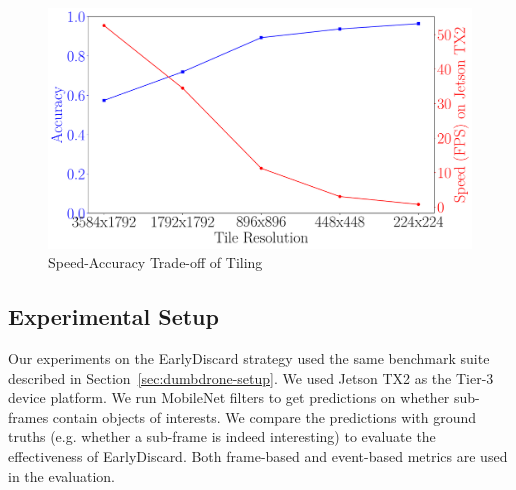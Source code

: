 \begin{figure}
    \centering
    \includegraphics[width=.8\linewidth]{FIGS/fig-tile-resolution-speed-accuracy.pdf}
    \caption{Speed-Accuracy Trade-off of Tiling}
    \label{fig:earlydiscard-tile-accuracy-speed}
\end{figure}


\subsection{Experimental Setup}

Our experiments on the EarlyDiscard strategy used the same benchmark suite
described in Section~\ref{sec:dumbdrone-setup}. We used Jetson TX2 as the Tier-3
device platform. We run MobileNet filters to get predictions on whether
sub-frames contain objects of interests. We compare the predictions with ground
truths (e.g. whether a sub-frame is indeed interesting) to evaluate the
effectiveness of EarlyDiscard. Both frame-based and event-based metrics are used
in the evaluation.

